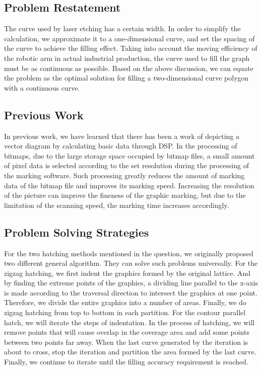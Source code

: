 \documentclass{apmcmthesis}
\begin{document}
\subsection{Problem Restatement}
  The curve used by laser etching has a certain width. In order to simplify the calculation, we approximate it to a one-dimensional curve, and set the spacing of the curve to achieve the filling effect. Taking into account the moving efficiency of the robotic arm in actual industrial production, the curve used to fill the graph must be as continuous as possible. Based on the above discussion, we can equate the problem as the optimal solution for filling a two-dimensional curve polygon with a continuous curve.


\subsection{Previous Work}
  In previous work, we have learned that there has been a work of depicting a vector diagram by calculating basic data through DSP. In the processing of bitmaps, due to the large storage space occupied by bitmap files, a small amount of pixel data is selected according to the set resolution during the processing of the marking software. Such processing greatly reduces the amount of marking data of the bitmap file and improves its marking speed. Increasing the resolution of the picture can improve the fineness of the graphic marking, but due to the limitation of the scanning speed, the marking time increases accordingly.


\subsection{Problem Solving Strategies}
For the two hatching methods mentioned in the question, we originally proposed two different general algorithm. They can solve such problems universally.
For the zigzag hatching, we first indent the graphics formed by the original lattice. And by finding the extreme points of the graphics, a dividing line parallel to the x-axis is made according to the traversal direction to intersect the graphics at one point. Therefore, we divide the entire graphics into a number of areas. Finally, we do zigzag hatching from top to bottom in each partition.
For the contour parallel hatch, we will iterate the steps of indentation. In the process of hatching, we will remove points that will cause overlap in the coverage area and add some points between two points far away. When the last curve generated by the iteration is about to cross, stop the iteration and partition the area formed by the last curve. Finally, we continue to iterate until the filling accuracy requirement is reached.
\end{document}
